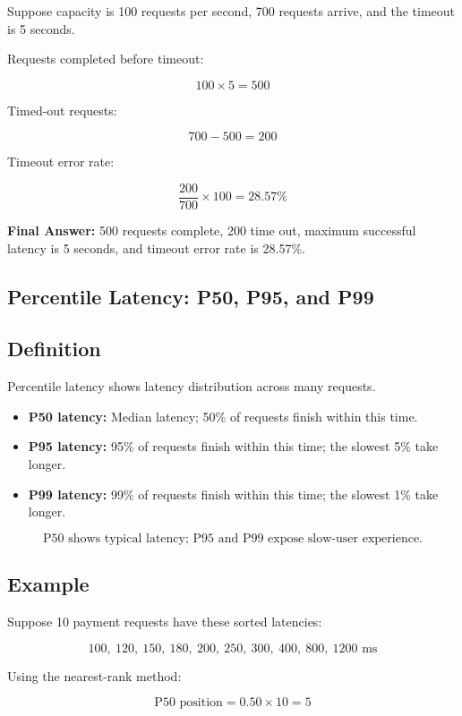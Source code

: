 \documentclass[11pt]{article}
\begin{document}
Suppose capacity is 100 requests per second, 700 requests arrive, and the timeout is 5 seconds.

Requests completed before timeout:

\[
100 \times 5 = 500
\]

Timed-out requests:

\[
700 - 500 = 200
\]

Timeout error rate:

\[
\frac{200}{700}
\times 100
=
28.57\%
\]

\textbf{Final Answer:} 500 requests complete, 200 time out, maximum successful latency is 5 seconds, and timeout error rate is 28.57\%.

\subsection*{Percentile Latency: P50, P95, and P99}

\subsection*{Definition}

Percentile latency shows latency distribution across many requests.

\begin{itemize}
    \item \textbf{P50 latency:} Median latency; 50\% of requests finish within this time.
    \item \textbf{P95 latency:} 95\% of requests finish within this time; the slowest 5\% take longer.
    \item \textbf{P99 latency:} 99\% of requests finish within this time; the slowest 1\% take longer.
\end{itemize}

\[
\boxed{
\text{P50 shows typical latency; P95 and P99 expose slow-user experience.}
}
\]

\subsection*{Example}

Suppose 10 payment requests have these sorted latencies:

\[
100,\ 120,\ 150,\ 180,\ 200,\ 250,\ 300,\ 400,\ 800,\ 1200 \text{ ms}
\]

Using the nearest-rank method:

\[
\text{P50 position} = 0.50 \times 10 = 5
\]
\end{document}
